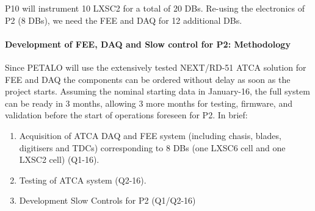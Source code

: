 P10 will instrument 10 LXSC2 for a total of 20 DBs. Re-using the electronics of P2 (8 DBs), we need the FEE and DAQ for 12 additional DBs. 
%
%
%
%
% 

\paragraph{Development of FEE, DAQ and Slow control for P2: Methodology}

Since PETALO will use the extensively tested NEXT/RD-51 ATCA solution for FEE and DAQ the components can be ordered without delay as soon as the project starts. Assuming the nominal starting data in January-16, the full system can be ready in 3 months, allowing 3 more months for testing, firmware, and validation before the start of operations foreseen for P2. In brief:  
\begin{enumerate}
\item Acquisition of ATCA DAQ and FEE system (including chasis, blades, digitisers and TDCs) corresponding to 8 DBs (one LXSC6 cell and one LXSC2 cell)  (Q1-16).
\item Testing of ATCA system (Q2-16).
\item Development Slow Controls for P2 (Q1/Q2-16)
\end{enumerate}

